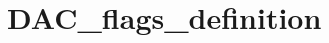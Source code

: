 \hypertarget{group___d_a_c__flags__definition}{\section{D\-A\-C\-\_\-flags\-\_\-definition}
\label{group___d_a_c__flags__definition}
}
